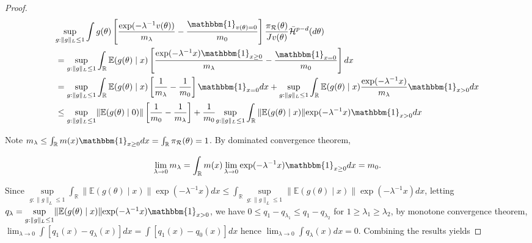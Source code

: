 \documentclass[10pt,fleqn]{article}
\newcommand{\mc}[1]{\mathcal{#1}}
\DeclareMathOperator{\1}{\mathbbm{1}}
\begin{document}
\begin{proof}[Proof]
\begin{equation}                
\label{wass0}
\begin{aligned}
&\underset{g:\|g\|_L\le 1}\sup\int g(\theta)  \left[ \frac{ \exp(- \lambda^{-1} v(\theta)) } {  m_\lambda}  - 
\frac{ \mathbbm{1}_{v(\theta)=0} } {  m_0} 
\right]  \frac{\pi_{\mc R}(\theta)}{Jv(\theta)}  \bar{\mc H}^{p-d}(d \theta) \\
&= \underset{g:\|g\|_L\le 1}\sup\int_\mathbb{R}  \mathbb{E}(g(\theta) \mid x)  \left[ \frac{ \exp(- \lambda^{-1} x) \mathbbm{1}_{x \ge 0}} {  m_\lambda}  - 
\frac{ \mathbbm{1}_{x=0} } {  m_0} 
\right] d x \\
&=      \underset{g:\|g\|_L\le 1}\sup\int_\mathbb{R}  \mathbb{E}(g(\theta) \mid x)  \left[ \frac{  1} {  m_\lambda}  - 
\frac{ 1 } {  m_0} 
\right]\mathbbm{1}_{x=0} d x  + \underset{g:\|g\|_L\le 1}\sup\int_\mathbb{R}  \mathbb{E}(g(\theta) \mid x)\frac{ \exp(- \lambda^{-1} x)} {  m_\lambda}  
\mathbbm{1}_{x > 0} d x \\
& \le \underset{g:\|g\|_L\le 1}\sup \|\mathbb{E}(g(\theta) \mid 0)\| \left[ \frac{ 1 } {  m_0} -\frac{  1} {  m_\lambda}   
\right] + \frac{1} {  m_0} \underset{g:\|g\|_L\le 1}\sup \int_\mathbb{R}  \|\mathbb{E}(g(\theta) \mid x)\| { \exp(- \lambda^{-1} x)}
\mathbbm{1}_{x > 0} d x \\      
\end{aligned}
\end{equation}


Note $m_\lambda\le \int_\mathbb{R} m(x) \mathbbm{1}_{x \ge 0}  dx =\int_\mathbb{R} \pi_{\mc R}(\theta) =1$. By dominated convergence theorem, 

\begin{equation}
\lim_{\lambda\rightarrow 0}m_\lambda= \int_\mathbb{R}  m(x) \lim_{\lambda\rightarrow 0}\exp(- \lambda^{-1} x ) \mathbbm{1}_{x \ge 0}  d x = m_0.
\end{equation}


Since 
$ \underset{g:\|g\|_L\le 1}\sup \int_\mathbb{R}  \|\mathbb{E}(g(\theta) \mid x)\| { \exp(- \lambda^{-1} x)} dx \le \int_\mathbb{R} \underset{g:\|g\|_L\le 1}\sup \|\mathbb{E}(g(\theta) \mid x)\| { \exp(- \lambda^{-1} x)} dx$,
letting $q_\lambda=       \underset{g:\|g\|_L\le 1}\sup \|\mathbb{E}(g(\theta) \mid x)\| { \exp(- \lambda^{-1} x)}
\mathbbm{1}_{x > 0}  $, we have $0\le q_1-q_{\lambda_1}\le q_1-q_{\lambda_2}$ for $1\ge\lambda_1\ge \lambda_2$, by monotone convergence theorem, $\lim_{\lambda\rightarrow 0}\int [ q_1(x)-q_\lambda(x)]dx = \int [q_1(x)- q_0(x) ]dx$ hence $\lim_{\lambda\rightarrow 0}\int q_\lambda(x)dx =0$. Combining the results yields 




\end{proof}
\end{document}
